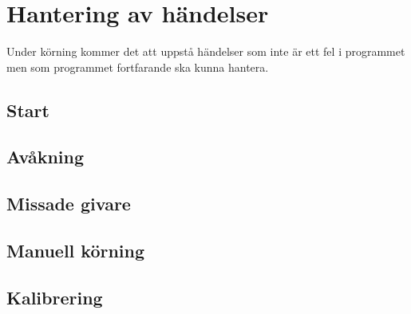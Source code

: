 \section{Hantering av händelser}

Under körning kommer det att uppstå händelser som inte är ett fel i
programmet men som programmet fortfarande ska kunna hantera.

\subsection{Start} 

\subsection{Avåkning} 

\subsection{Missade givare} 

\subsection{Manuell körning} 

\subsection{Kalibrering} 

